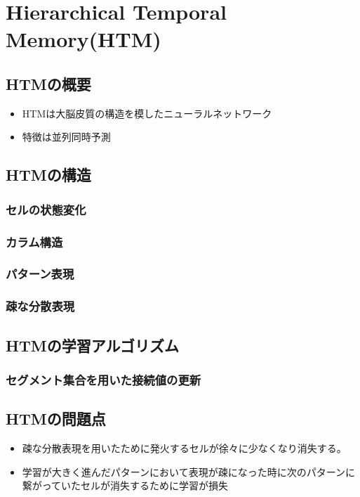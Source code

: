 \chapter{Hierarchical Temporal Memory(HTM)}
\section{HTMの概要}
\begin{itemize}
  \item HTMは大脳皮質の構造を模したニューラルネットワーク
  \item 特徴は並列同時予測
\end{itemize}

\section{HTMの構造}
\subsection{セルの状態変化}
\subsection{カラム構造}
\subsection{パターン表現}
\subsection{疎な分散表現}


\section{HTMの学習アルゴリズム}
\subsection{セグメント集合を用いた接続値の更新}


\section{HTMの問題点}
\begin{itemize}
  \item 疎な分散表現を用いたために発火するセルが徐々に少なくなり消失する。
  \item 学習が大きく進んだパターンにおいて表現が疎になった時に次のパターンに繋がっていたセルが消失するために学習が損失
\end{itemize}
